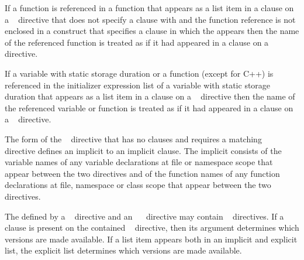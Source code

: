 \begin{ccppspecific}
If a function is referenced in a function that appears as a list item in a 
clause on a ~ directive that does not specify a 
clause with  and the function reference is not
enclosed in a  construct that specifies a  clause in which the
  appears then the name of the referenced function is
treated as if it had appeared in a  clause on a ~
directive.

If a variable with static storage duration or a function (except 
for C++) is referenced in the initializer expression list of a variable with
static storage duration that appears as a list item in a  clause on a 
~ directive then the name of the referenced variable 
or function is treated as if it had appeared in a  clause on a 
~ directive.

The form of the ~ directive that has no clauses
and requires a matching ~~ directive
defines an implicit  to an implicit 
clause. The implicit  consists of the variable names
of any variable declarations at file or namespace scope that appear between
the two directives and of the function names of any function declarations at
file, namespace or class scope that appear between the two directives.

The  defined by a
~ directive and an
~~ directive may contain
~ directives. If a  clause
is present on the contained ~ directive, then its
argument determines which versions are made available.
If a list item appears both in an implicit and explicit list, the explicit
list determines which versions are made available.

\end{ccppspecific}

